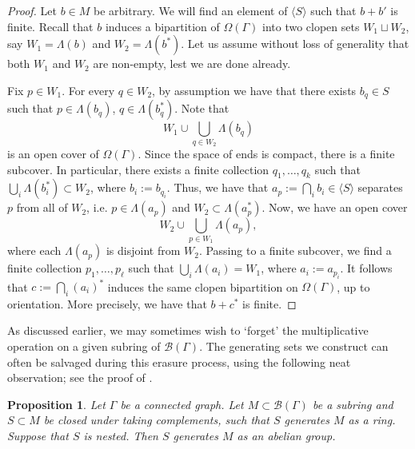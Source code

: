 \documentclass[11pt,a4paper]{amsart}
\newtheorem{proposition}[theorem]{Proposition}
\theoremstyle{definition}
\newcommand{\br}{{\mathscr{B}}}
\begin{document}
\begin{proof}
    Let $b \in M$ be arbitrary. We will find an element of $\langle S \rangle$ such that $b + b'$ is finite. Recall that $b$ induces a bipartition of $\Omega(\Gamma)$ into two clopen sets $W_1 \sqcup W_2$, say $W_1 = \Lambda(b)$ and $W_2 = \Lambda(b^\ast)$. Let us assume without loss of generality that both $W_1$ and $W_2$ are non-empty, lest we are done already. 

    Fix $p \in W_1$. For every $q \in W_2$, by assumption we have that there exists $b_q \in S$ such that $p \in \Lambda(b_q)$, $q \in \Lambda(b_q^\ast)$. Note that 
    $$
    W_1 \cup \bigcup_{q \in W_2} \Lambda(b_q)
    $$
    is an open cover of $\Omega(\Gamma)$. Since the space of ends is compact, there is a finite subcover. In particular, there exists a finite collection $q_1, \ldots, q_k$ such that $\bigcup_i \Lambda(b_i^\ast) \subset W_2$, where $b_i := b_{q_i}$. Thus, we have that $a_p := \bigcap_i b_i \in \langle S \rangle$ separates $p$ from all of $W_2$, i.e. $p \in \Lambda(a_p)$ and $W_2 \subset \Lambda(a_p^\ast)$.
    Now, we have an open cover 
    $$
    W_2 \cup \bigcup_{p \in W_1} \Lambda(a_p),
    $$
    where each $\Lambda(a_p)$ is disjoint from $W_2$. Passing to a finite subcover, we find a finite collection $p_1, \ldots, p_\ell$ such that $\bigcup_i \Lambda(a_i) = W_1$, where $a_i := a_{p_i}$. It follows that $c := \bigcap_i (a_i)^\ast$ induces the same clopen bipartition on $\Omega(\Gamma)$, up to orientation. More precisely, we have that $b + c^\ast$ is finite.
\end{proof}


As discussed earlier, we may sometimes wish to `forget' the multiplicative operation on a given subring of $\br(\Gamma)$. The generating sets we construct can often be salvaged during this erasure process, using the following neat observation; see the proof of \cite[Prop.~6.2]{thomassen1993vertex}. 

\begin{proposition}\label{prop:gen-set-upgrade}
    Let $\Gamma$ be a connected graph. Let $M \subset \br(\Gamma)$ be a subring and $S \subset M$ be closed under taking complements, such that $S$ generates $M$ as a ring. Suppose that $S$ is nested. Then $S$ generates $M$ as an abelian group.
\end{proposition}
\end{document}
